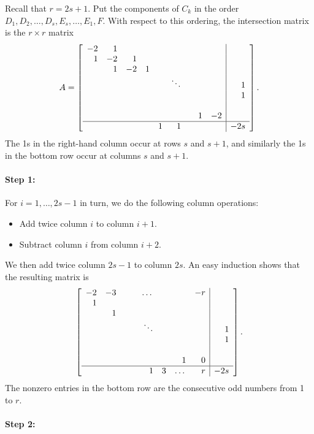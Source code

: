 \documentclass[reqno]{amsart}
\theoremstyle{definition}
\theoremstyle{remark}
\begin{document}
Recall that $r = 2s + 1$. Put the components of $C_k$ in the order $D_1, D_2, \dots, D_{s}, E_{s}, \dots, E_1, F$. With respect to this ordering, the intersection matrix is the $r \times r$ matrix
\[
A = \left[\begin{array}{rrrrrrrrr|rr}
  -2 & 1 & & & & & & & & \\
  1 & -2 & 1 & & & & & & & \\
  & 1 & -2 & 1 & & & & & & \\
  & & & & & \ddots & & & & 1 \\
  & & & & & & & & & 1 \\
  & & & & & & & & & \\
  & & & & & & & 1 & -2 & \\ \hline
  & & & & 1 & 1 & & & & -2s
\end{array}\right].
\]
The 1s in the right-hand column occur at rows $s$ and $s+1$, and similarly the 1s in the bottom row occur at columns $s$ and $s+1$.

\paragraph{Step 1:}
\label{sec:step-1-odd}

For $i = 1, \dots, 2s-1$ in turn, we do the following column operations:
\begin{itemize}
    \item Add twice column $i$ to column $i+1$.
    \item Subtract column $i$ from column $i+2$.
\end{itemize}
We then add twice column $2s-1$ to column $2s$. An easy induction shows that the resulting matrix is
\[
\left[\begin{array}{rrrrrrrr|r}
  -2 & -3 & & & \dots & & & -r & \\
  1 & & & & & & & & \\
  & 1 & & & & & & & \\
  & & & & \ddots & & & & 1 \\
  & & & &  & & & & 1 \\
  & & & &  & & & & \\
  & & & & & & 1 & 0 & \\ \hline
  & & & & 1 & 3 & \dots & r & -2s
\end{array}\right].
\]
The nonzero entries in the bottom row are the consecutive odd numbers from 1 to $r$.

\paragraph{Step 2:}
\label{sec:step-2-odd}
\end{document}
